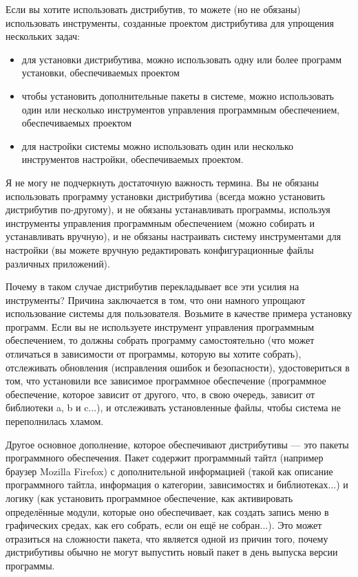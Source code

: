 \documentclass[12pt]{book}
\begin{document}
Если вы хотите использовать дистрибутив, то можете (но не обязаны) использовать инструменты, созданные проектом дистрибутива для упрощения нескольких задач:

\begin{itemize}
	\item для установки дистрибутива, можно использовать одну или более программ установки, обеспечиваемых проектом
	\item чтобы установить дополнительные пакеты в системе, можно использовать один или несколько инструментов управления программным обеспечением, обеспечиваемых проектом
	\item для настройки системы можно использовать один или несколько инструментов настройки, обеспечиваемых проектом.
\end{itemize}

Я не могу не подчеркнуть достаточную важность термина. Вы не обязаны использовать программу установки дистрибутива (всегда можно установить дистрибутив по-другому), и не обязаны устанавливать программы, используя инструменты управления программным обеспечением (можно собирать и устанавливать вручную), и не обязаны настраивать систему инструментами  для настройки (вы можете вручную редактировать конфигурационные файлы различных приложений).

Почему в таком случае дистрибутив перекладывает все эти усилия на инструменты? Причина заключается в том, что они намного упрощают использование системы для пользователя.  Возьмите в качестве примера установку программ. Если вы не используете инструмент управления программным обеспечением, то должны собрать программу самостоятельно (что может отличаться в зависимости от программы, которую вы хотите собрать), отслеживать обновления (исправления ошибок и безопасности), удостовериться в том, что установили все зависимое программное обеспечение (программное обеспечение, которое зависит от другого, что, в свою очередь, зависит от библиотеки a, b и c...), и отслеживать установленные файлы, чтобы система не переполнилась хламом.

Другое основное дополнение, которое обеспечивают дистрибутивы — это пакеты программного обеспечения. Пакет содержит программный тайтл (например браузер Mozilla Firefox) с дополнительной информацией (такой как описание программного тайтла, информация о категории, зависимостях и библиотеках...) и логику (как установить программное обеспечение, как активировать определённые модули, которые оно обеспечивает, как создать запись меню в графических средах, как его собрать, если он ещё не собран...). Это может отразиться на сложности пакета, что является одной из причин того, почему дистрибутивы обычно не могут выпустить новый пакет в день выпуска версии программы.
\end{document}
